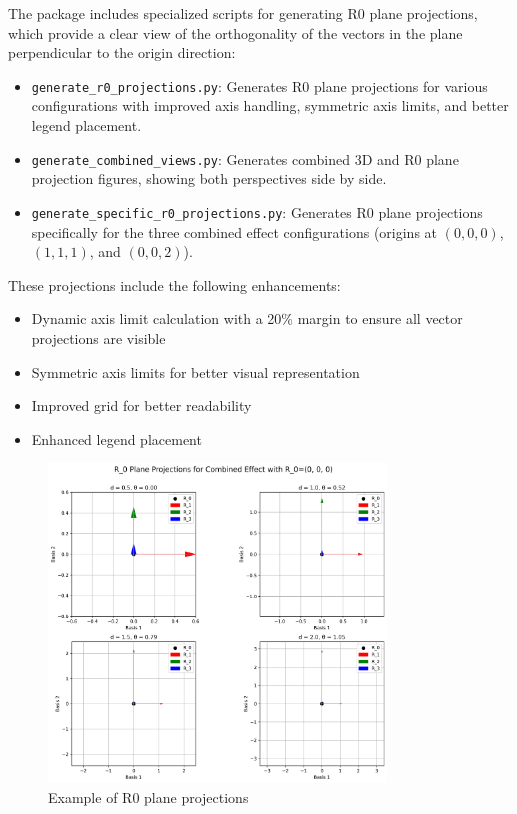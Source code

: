 The package includes specialized scripts for generating R0 plane projections, which provide a clear view of the orthogonality of the vectors in the plane perpendicular to the origin direction:

\begin{itemize}
    \item \texttt{generate\_r0\_projections.py}: Generates R0 plane projections for various configurations with improved axis handling, symmetric axis limits, and better legend placement.
    \item \texttt{generate\_combined\_views.py}: Generates combined 3D and R0 plane projection figures, showing both perspectives side by side.
    \item \texttt{generate\_specific\_r0\_projections.py}: Generates R0 plane projections specifically for the three combined effect configurations (origins at $(0,0,0)$, $(1,1,1)$, and $(0,0,2)$).
\end{itemize}

These projections include the following enhancements:
\begin{itemize}
    \item Dynamic axis limit calculation with a 20\% margin to ensure all vector projections are visible
    \item Symmetric axis limits for better visual representation
    \item Improved grid for better readability
    \item Enhanced legend placement
\end{itemize}

\begin{figure}[H]
    \centering
    \includegraphics[width=0.8\textwidth]{figures/r0_projections_combined_effect_R0_0_0_0.png}
    \caption{Example of R0 plane projections}
    \label{fig:vis_r0_projections}
\end{figure}

